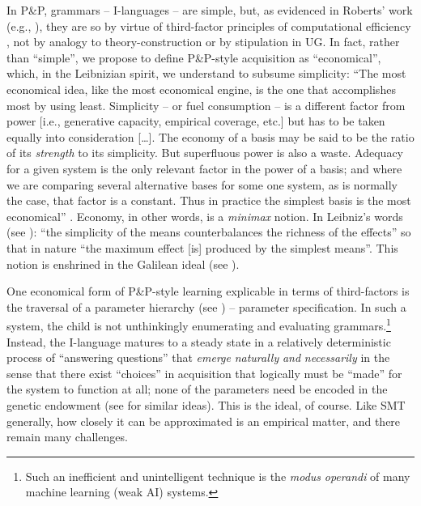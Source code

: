 \documentclass[output=paper]{langsci/langscibook}
\begin{document}
In P\&P, grammars – I-languages – are simple, but, as evidenced in Roberts’
work (e.g., \citealt{RobHol2010}), they are so by virtue of
third-factor principles of computational efficiency \citep{Chomsky2005}, not by
analogy to theory-construction or by stipulation in \gls{UG}. In fact, rather than
“simple”, we propose to define P\&P-style acquisition as “economical”, which,
in the Leibnizian spirit, we understand to subsume simplicity: “The most
economical idea, like the most economical engine, is the one that accomplishes
most by using least. Simplicity – or fuel consumption – is a different factor
from power [i.e., generative capacity, empirical coverage, etc.] but has to be
taken equally into consideration […]. The economy of a basis may be said to be
the ratio of its \emph{strength} to its simplicity. But superfluous power is
also a waste. Adequacy for a given system is the only relevant factor in the
power of a basis; and where we are comparing several alternative bases for some
one system, as is normally the case, that factor is a constant. Thus in
practice the simplest basis is the most economical” \citep[111]{Goodman1943}.
Economy, in other words, is a \emph{minimax} notion. In Leibniz’s words (see
\citealt{RobertsWatumull2015}): “the simplicity of the means counterbalances
the richness of the effects” so that in nature “the maximum effect [is]
produced by the simplest means”. This notion is enshrined in the Galilean ideal
(see \citealt{Chomsky2002}).

One economical form of P\&P-style learning explicable in terms of third-factors
is the traversal of a parameter hierarchy (see
\citealt{Roberts2012,Biberauer2016c}) – parameter specification. In such a
system, the child is not unthinkingly enumerating and evaluating
grammars.\footnote{Such an inefficient and unintelligent technique is the
\emph{modus} \emph{operandi} of many machine learning (weak AI) systems.}
Instead, the I-language matures to a steady state in a relatively deterministic
process of “answering questions” that \emph{emerge} \emph{naturally} \emph{and}
\emph{necessarily} in the sense that there exist “choices” in
acquisition that logically must be “made” for the
system to function at all; none of the parameters need be encoded in the
genetic endowment (see \citealt{ObataEtAl2015} for similar ideas). This is the
ideal, of course. Like \gls{SMT} generally, how
closely it can be approximated is an empirical matter, and there remain many
challenges.
\end{document}
